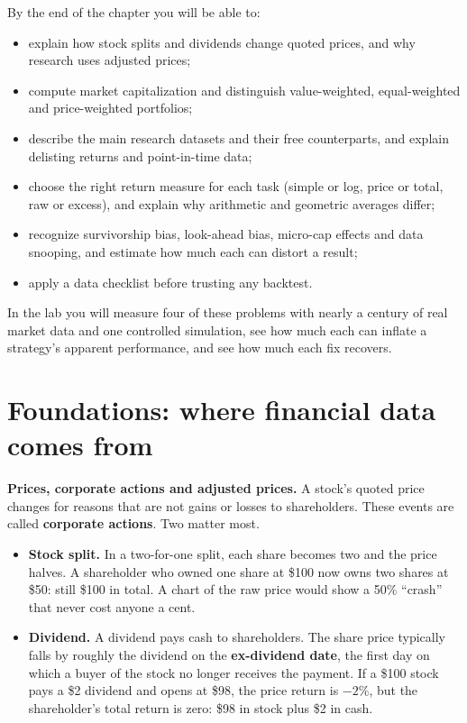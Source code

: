 By the end of the chapter you will be able to:

\begin{itemize}
  \item explain how stock splits and dividends change quoted prices, and why research uses adjusted prices;
  \item compute market capitalization and distinguish value-weighted, equal-weighted and price-weighted portfolios;
  \item describe the main research datasets and their free counterparts, and explain delisting returns and point-in-time data;
  \item choose the right return measure for each task (simple or log, price or total, raw or excess), and explain why arithmetic and geometric averages differ;
  \item recognize survivorship bias, look-ahead bias, micro-cap effects and data snooping, and estimate how much each can distort a result;
  \item apply a data checklist before trusting any backtest.
\end{itemize}

In the lab you will measure four of these problems with nearly a century of real market data and one controlled simulation, see how much each can inflate a strategy's apparent performance, and see how much each fix recovers.

\section{Foundations: where financial data comes from}
\label{sec:02-foundations}

\textbf{Prices, corporate actions and adjusted prices.} A stock's quoted price changes for reasons that are not gains or losses to shareholders. These events are called \textbf{corporate actions}. Two matter most.

\begin{itemize}
  \item \textbf{Stock split.} In a two-for-one split, each share becomes two and the price halves. A shareholder who owned one share at \$100 now owns two shares at \$50: still \$100 in total. A chart of the raw price would show a 50\% ``crash'' that never cost anyone a cent.
  \item \textbf{Dividend.} A dividend pays cash to shareholders. The share price typically falls by roughly the dividend on the \textbf{ex-dividend date}, the first day on which a buyer of the stock no longer receives the payment. If a \$100 stock pays a \$2 dividend and opens at \$98, the price return is $-2$\%, but the shareholder's total return is zero: \$98 in stock plus \$2 in cash.
\end{itemize}

